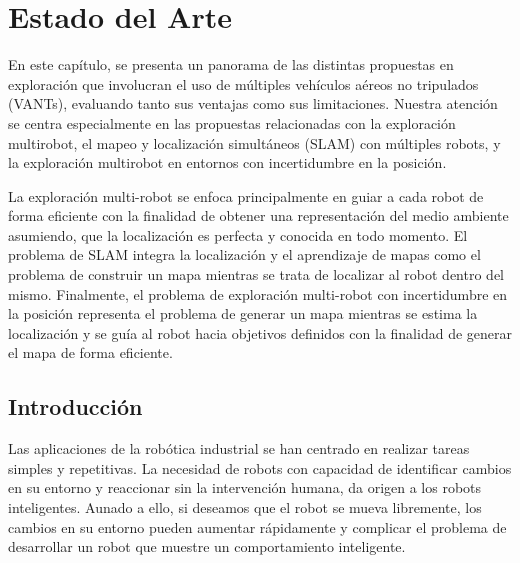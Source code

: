 \chapter{Estado del Arte}

En este capítulo, se presenta un panorama de las distintas propuestas en exploración que involucran el uso de múltiples vehículos aéreos no tripulados (VANTs), evaluando tanto sus ventajas como sus limitaciones. Nuestra atención se centra especialmente en las propuestas relacionadas con la exploración multirobot, el mapeo y localización simultáneos (SLAM) con múltiples robots, y la exploración multirobot en entornos con incertidumbre en la posición.


La exploración multi-robot se enfoca principalmente en guiar a cada robot de forma eficiente con la finalidad de obtener una representación del medio ambiente asumiendo, que la localización es perfecta y conocida en todo momento. El problema de SLAM integra la localización y el aprendizaje de mapas como el problema de construir un mapa mientras se trata de localizar al robot dentro del mismo. Finalmente, el problema de exploración multi-robot con incertidumbre en la posición representa el problema de generar un mapa mientras se estima la localización y se guía al robot hacia objetivos definidos con la finalidad de generar el mapa de forma eficiente.


\section{Introducción}

Las aplicaciones de la rob\'{o}tica industrial se han centrado en realizar tareas simples y repetitivas. La necesidad de robots con capacidad de identificar cambios en su entorno y reaccionar sin la intervenci\'{o}n humana, da origen a los robots inteligentes. Aunado a ello, si deseamos que el robot se mueva libremente, los cambios en su entorno pueden aumentar r\'{a}pidamente y complicar el problema de desarrollar un robot que muestre un comportamiento inteligente.

